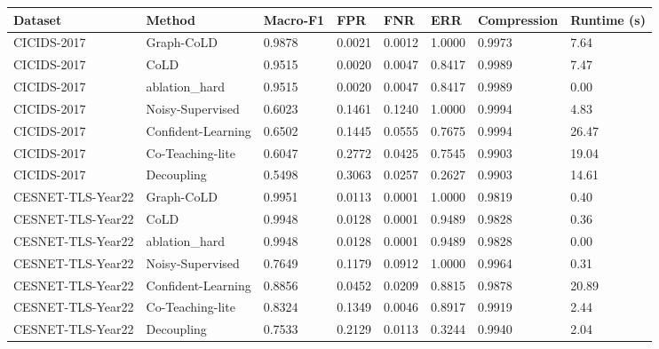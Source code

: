 \small
\begin{tabular}{llllllll}
\hline
Dataset & Method & Macro-F1 & FPR & FNR & ERR & Compression & Runtime (s) \\
\hline
CICIDS-2017 & Graph-CoLD & 0.9878 & 0.0021 & 0.0012 & 1.0000 & 0.9973 & 7.64 \\
CICIDS-2017 & CoLD & 0.9515 & 0.0020 & 0.0047 & 0.8417 & 0.9989 & 7.47 \\
CICIDS-2017 & ablation\_hard & 0.9515 & 0.0020 & 0.0047 & 0.8417 & 0.9989 & 0.00 \\
CICIDS-2017 & Noisy-Supervised & 0.6023 & 0.1461 & 0.1240 & 1.0000 & 0.9994 & 4.83 \\
CICIDS-2017 & Confident-Learning & 0.6502 & 0.1445 & 0.0555 & 0.7675 & 0.9994 & 26.47 \\
CICIDS-2017 & Co-Teaching-lite & 0.6047 & 0.2772 & 0.0425 & 0.7545 & 0.9903 & 19.04 \\
CICIDS-2017 & Decoupling & 0.5498 & 0.3063 & 0.0257 & 0.2627 & 0.9903 & 14.61 \\
CESNET-TLS-Year22 & Graph-CoLD & 0.9951 & 0.0113 & 0.0001 & 1.0000 & 0.9819 & 0.40 \\
CESNET-TLS-Year22 & CoLD & 0.9948 & 0.0128 & 0.0001 & 0.9489 & 0.9828 & 0.36 \\
CESNET-TLS-Year22 & ablation\_hard & 0.9948 & 0.0128 & 0.0001 & 0.9489 & 0.9828 & 0.00 \\
CESNET-TLS-Year22 & Noisy-Supervised & 0.7649 & 0.1179 & 0.0912 & 1.0000 & 0.9964 & 0.31 \\
CESNET-TLS-Year22 & Confident-Learning & 0.8856 & 0.0452 & 0.0209 & 0.8815 & 0.9878 & 20.89 \\
CESNET-TLS-Year22 & Co-Teaching-lite & 0.8324 & 0.1349 & 0.0046 & 0.8917 & 0.9919 & 2.44 \\
CESNET-TLS-Year22 & Decoupling & 0.7533 & 0.2129 & 0.0113 & 0.3244 & 0.9940 & 2.04 \\
\hline
\end{tabular}
